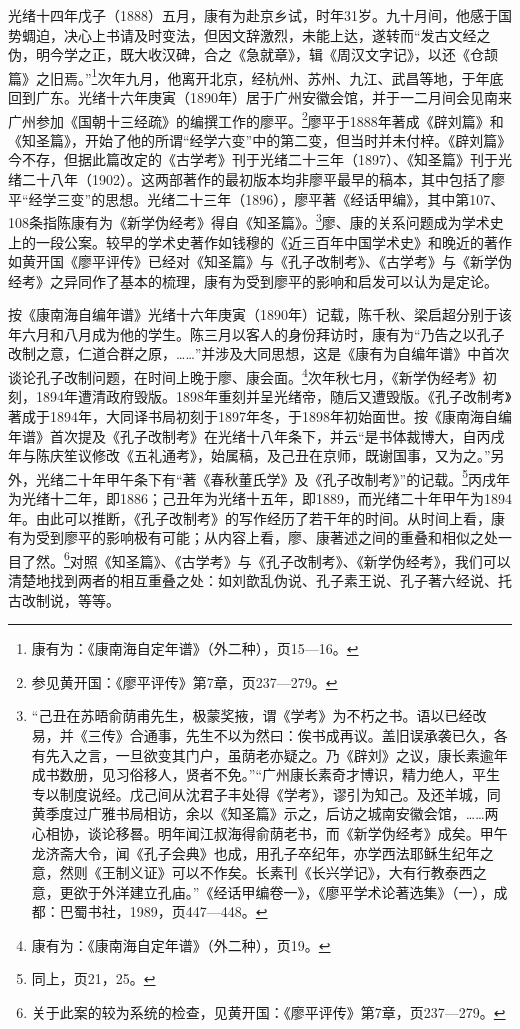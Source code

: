 \documentclass[a4paper, 12pt, openright]{ctexbook}
\begin{document}
光绪十四年戊子（1888）五月，康有为赴京乡试，时年31岁。九十月间，他感于国势蜩迫，决心上书请及时变法，但因文辞激烈，未能上达，遂转而“发古文经之伪，明今学之正，既大收汉碑，合之《急就章》，辑《周汉文字记》，以还《仓颉篇》之旧焉。”\footnote{康有为：《康南海自定年谱》（外二种），页15—16。}次年九月，他离开北京，经杭州、苏州、九江、武昌等地，于年底回到广东。光绪十六年庚寅（1890年）居于广州安徽会馆，并于一二月间会见南来广州参加《国朝十三经疏》的编撰工作的廖平。\footnote{参见黄开国：《廖平评传》第7章，页237—279。}廖平于1888年著成《辟刘篇》和《知圣篇》，开始了他的所谓“经学六变”中的第二变，但当时并未付梓。《辟刘篇》今不存，但据此篇改定的《古学考》刊于光绪二十三年（1897）、《知圣篇》刊于光绪二十八年（1902）。这两部著作的最初版本均非廖平最早的稿本，其中包括了廖平“经学三变”的思想。光绪二十三年（1896），廖平著《经话甲编》，其中第107、108条指陈康有为《新学伪经考》得自《知圣篇》。\footnote{“己丑在苏晤俞荫甫先生，极蒙奖掖，谓《学考》为不朽之书。语以已经改易，并《三传》合通事，先生不以为然曰：俟书成再议。盖旧误承袭已久，各有先入之言，一旦欲变其门户，虽荫老亦疑之。乃《辟刘》之议，康长素逾年成书数册，见习俗移人，贤者不免。”“广州康长素奇才博识，精力绝人，平生专以制度说经。戊己间从沈君子丰处得《学考》，谬引为知己。及还羊城，同黄季度过广雅书局相访，余以《知圣篇》示之，后访之城南安徽会馆，……两心相协，谈论移晷。明年闻江叔海得俞荫老书，而《新学伪经考》成矣。甲午龙济斋大令，闻《孔子会典》也成，用孔子卒纪年，亦学西法耶稣生纪年之意，然则《王制义证》可以不作矣。长素刊《长兴学记》，大有行教泰西之意，更欲于外洋建立孔庙。”《经话甲编卷一》，《廖平学术论著选集》（一），成都：巴蜀书社，1989，页447—448。}廖、康的关系问题成为学术史上的一段公案。较早的学术史著作如钱穆的《近三百年中国学术史》和晚近的著作如黄开国《廖平评传》已经对《知圣篇》与《孔子改制考》、《古学考》与《新学伪经考》之异同作了基本的梳理，康有为受到廖平的影响和启发可以认为是定论。

按《康南海自编年谱》光绪十六年庚寅（1890年）记载，陈千秋、梁启超分别于该年六月和八月成为他的学生。陈三月以客人的身份拜访时，康有为“乃告之以孔子改制之意，仁道合群之原，……”并涉及大同思想，这是《康有为自编年谱》中首次谈论孔子改制问题，在时间上晚于廖、康会面。\footnote{康有为：《康南海自定年谱》（外二种），页19。}次年秋七月，《新学伪经考》初刻，1894年遭清政府毁版。1898年重刻并呈光绪帝，随后又遭毁版。《孔子改制考》著成于1894年，大同译书局初刻于1897年冬，于1898年初始面世。按《康南海自编年谱》首次提及《孔子改制考》在光绪十八年条下，并云“是书体裁博大，自丙戌年与陈庆笙议修改《五礼通考》，始属稿，及己丑在京师，既谢国事，又为之。”另外，光绪二十年甲午条下有“著《春秋董氏学》及《孔子改制考》”的记载。\footnote{同上，页21，25。}丙戌年为光绪十二年，即1886；己丑年为光绪十五年，即1889，而光绪二十年甲午为1894年。由此可以推断，《孔子改制考》的写作经历了若干年的时间。从时间上看，康有为受到廖平的影响极有可能；从内容上看，廖、康著述之间的重叠和相似之处一目了然。\footnote{关于此案的较为系统的检查，见黄开国：《廖平评传》第7章，页237—279。}对照《知圣篇》、《古学考》与《孔子改制考》、《新学伪经考》，我们可以清楚地找到两者的相互重叠之处：如刘歆乱伪说、孔子素王说、孔子著六经说、托古改制说，等等。
\end{document}
